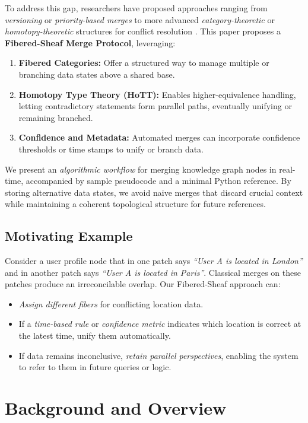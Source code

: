 \documentclass{article}
\begin{document}
To address this gap, researchers have proposed approaches ranging from \emph{versioning} or \emph{priority-based merges} to more advanced \emph{category-theoretic} or \emph{homotopy-theoretic} structures for conflict resolution \citep{sheafmemory2023design}. This paper proposes a \textbf{Fibered-Sheaf Merge Protocol}, leveraging:
\begin{enumerate}
    \item \textbf{Fibered Categories:} Offer a structured way to manage multiple or branching data states above a shared base.  
    \item \textbf{Homotopy Type Theory (HoTT):} Enables higher-equivalence handling, letting contradictory statements form parallel paths, eventually unifying or remaining branched.  
    \item \textbf{Confidence and Metadata:} Automated merges can incorporate confidence thresholds or time stamps to unify or branch data.  
\end{enumerate}

We present an \emph{algorithmic workflow} for merging knowledge graph nodes in real-time, accompanied by sample pseudocode and a minimal Python reference. By storing alternative data states, we avoid naive merges that discard crucial context while maintaining a coherent topological structure for future references.

\subsection{Motivating Example}

Consider a user profile node that in one patch says \emph{``User A is located in London''} and in another patch says \emph{``User A is located in Paris''}. Classical merges on these patches produce an irreconcilable overlap. Our Fibered-Sheaf approach can:
\begin{itemize}
    \item \emph{Assign different fibers} for conflicting location data.
    \item If a \emph{time-based rule} or \emph{confidence metric} indicates which location is correct at the latest time, unify them automatically.
    \item If data remains inconclusive, \emph{retain parallel perspectives}, enabling the system to refer to them in future queries or logic.
\end{itemize}

\section{Background and Overview}
\label{sec:background}
\end{document}
